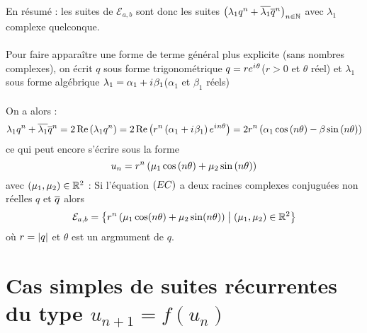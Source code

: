 \begin{dem}
\begin{itemize}
\begin{itemize}
        \end{itemize}
        En résumé : les suites de \(\mathcal{E}_{a,b}\) sont donc les suites \(\left(\lambda_1 q^n + \overline{\lambda_1}\overline{q}^n\right)_{n \in \mathbb{N}} \) avec \(\lambda_1\) complexe quelconque. \\~\\
        Pour faire apparaître une forme de terme général plus explicite (sans nombres complexes), on écrit \(q\) sous forme trigonométrique \(q = re^{i\mkern1mu \theta}\)(\(r>0\) et \(\theta\) réel) et \(\lambda_1\) sous forme algébrique \(\lambda_1 = \alpha_1 + i\mkern1mu \beta_1\)(\(\alpha_1\) et \(\beta_1\) réels)\\~\\
        On a alors : \[\lambda_1 q^n + \overline{\lambda_1}\overline{q}^n = 2\operatorname{Re}\left(\lambda_1q^n\right) = 2\operatorname{Re}\left(r^n\left(\alpha_1+i\mkern1mu \beta_1\right)e^{i\mkern1mu n \theta}\right) = 2r^n\left(\alpha_1\cos\left(n\theta\right)-\beta \sin\left(n\theta\right)\right)\]
        ce qui peut encore s'écrire sous la forme 
        \[u_n = r^n\left(\mu_1\cos\left(n\theta\right) + \mu_2\sin\left(n\theta\right)\right)\]
        avec \(\left(\mu_1,\mu_2\right) \in \mathbb{R}^2\)
        \conclusion : Si l'équation \(\left(EC\right)\) a deux racines complexes conjuguées non réelles \(q\) et \(\overline{q}\) alors 
        \[\mathcal{E}_{a,b} = \left\lbrace r^n\left(\mu_1\cos(n \theta)+\mu_2 \sin(n \theta)\right)\;\middle|\; \left(\mu_1,\mu_2\right)\in \mathbb{R}^2\right\rbrace\]
        où \(r= \left\lvert q\right\rvert\) et \(\theta\) est un argmument de \(q\).
    \end{itemize}
\end{dem}

\section{Cas simples de suites récurrentes du type \(u_{n+1} = f (u_n)\)}

